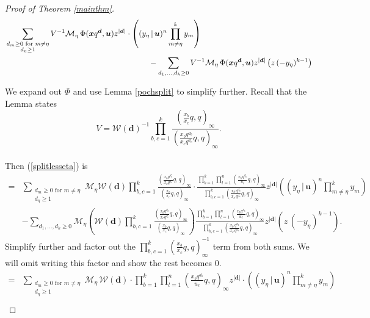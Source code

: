 \documentclass[12pt]{article}
\theoremstyle{plain}
\theoremstyle{definition}
\newcommand{\xb}{\boldsymbol{x}}
\newcommand{\ub}{\boldsymbol{u}}
\begin{document}
\begin{proof}[Proof of Theorem \ref{mainthm}]
\begin{align}
&\sum_{\substack{d_m\geq 0 \text{ for } m\neq\eta \\d_\eta \geq 1}}  V ^{-1}\mathcal{M}_\eta \, \Phi(\xb q^{\boldsymbol{d}},\ub){z}^{|\boldsymbol{d}|}  \cdot \left(  (y_\eta \, | \, \ub)^{n} \prod _{m\neq \eta} ^k y_m\right)\nonumber \\&\hspace{2.5in}
- \sum_{d_1,\dots,d_k \geq 0} V ^{-1}\mathcal{M}_\eta \, \Phi(\xb q^{\boldsymbol{d}},\ub){z}^{|\boldsymbol{d}|}\left(z\, (-y_\eta )^{k-1}\right)\label{splitlesseta}
\end{align}

We expand out $\Phi$ and use Lemma \ref{pochsplit} to simplify further. Recall that the Lemma states $$V=\mathcal{W}(\boldsymbol{d})^{-1}\prod_{b,c=1}^k \frac{\left(\frac{x_b}{x_c}q, q \right)_\infty}{\left(\frac{x_bq^{d_b}}{x_cq^{d_c}}q,q\right)_\infty}.$$\\
  Then (\ref{splitlesseta}) is 
\begin{align*}
=&\sum_{\substack{d_m\geq 0 \text{ for } m\neq\eta \\d_\eta \geq 1}} \mathcal{M}_\eta  \mathcal{W}(\boldsymbol{d})\prod_{b,c=1}^k \frac{\left(\frac{x_bq^{d_b}}{x_cq^{d_c}}q,q\right)_\infty}{\left(\frac{x_b}{x_c}q, q \right)_\infty}\cdot \frac{\prod_{b=1} ^k \prod_{l=1}^n \left(\frac{x_b q^{d_b}}{u_\ell}q,q \right)_\infty}{\prod\limits_{b,c=1}^k \left(\frac{x_b \,q^{d_b}}{x_c \,q^{d_c}}q,q\right)_\infty}{z}^{|\boldsymbol{d}|}  \left(  (y_\eta \, | \, \ub)^{n} \prod _{m\neq \eta} ^k y_m\right) \\
&
- \sum_{d_1,\dots,d_k \geq 0} \mathcal{M}_\eta \left(\mathcal{W}(\boldsymbol{d})\prod_{b,c=1}^k \frac{\left(\frac{x_bq^{d_b}}{x_cq^{d_c}}q,q\right)_\infty}{\left(\frac{x_b}{x_c}q, q \right)_\infty}\right) \frac{\prod_{b=1} ^k \prod_{l=1}^n \left(\frac{x_b q^{d_b}}{u_\ell}q,q \right)_\infty}{\prod\limits_{b,c=1}^k \left(\frac{x_b \,q^{d_b}}{x_c \,q^{d_c}}q,q\right)_\infty}{z}^{|\boldsymbol{d}|}\left(z\, (-y_\eta )^{k-1}\right).
\end{align*}
Simplify further and factor out the $\prod_{b,c=1} ^k \left( \frac{x_b}{x_c}q, q \right)^{-1}_\infty$ term from both sums. We will omit writing this factor and show the rest becomes 0.
\begin{align}\label{nearfinish}
=&\sum_{\substack{d_m\geq 0 \text{ for } m\neq\eta \\d_\eta \geq 1}} \mathcal{M}_\eta  \, \mathcal{W}(\boldsymbol{d})\cdot {\prod_{b=1} ^k \prod_{l=1}^n \left(\frac{x_b q^{d_b}}{u_\ell}q,q \right)_\infty}{z}^{|\boldsymbol{d}|}  \cdot \left(  (y_\eta \, | \, \ub)^{n} \prod _{m\neq \eta} ^k y_m\right) \nonumber \\

\end{align}
\end{proof}
\end{document}
